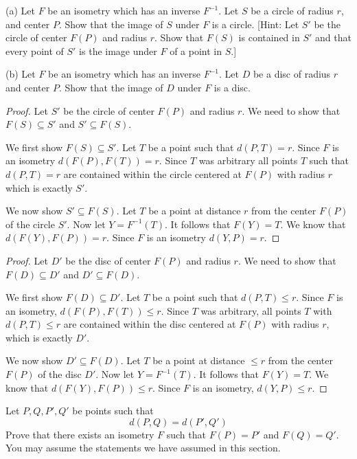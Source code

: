 \begin{tcolorbox}[title=Problem 1, breakable]
    (a) Let $F$ be an isometry which has an inverse $F^{-1}$.
    Let $S$ be a circle of radius $r$, and center $P$.
    Show that the image of $S$ under $F$ is a circle.
    [Hint: Let $S'$ be the circle of center $F(P)$ and radius $r$.
    Show that $F(S)$ is contained in $S'$ and that every point of $S'$
    is the image under $F$ of a point in $S$.]

    (b) Let $F$ be an isometry which has an inverse $F^{-1}$.
    Let $D$ be a disc of radius $r$ and center $P$.
    Show that the image of $D$ under $F$ is a disc.
\end{tcolorbox}

\begin{proof}
    Let $S'$ be the circle of center $F(P)$ and radius $r$.
    We need to show that $F(S) \subseteq S'$ and $S' \subseteq F(S)$.

    We first show $F(S) \subseteq S'$. Let $T$ be a point such that $d(P, T) = r$.
    Since $F$ is an isometry $d(F(P), F(T)) = r$.
    Since $T$ was arbitrary all points $T$ such that $d(P, T) = r$
        are contained within the circle centered at 
        $F(P)$ with radius $r$ which is exactly $S'$.

    We now show $S' \subseteq F(S)$. 
    Let $T$ be a point at distance $r$ from the center $F(P)$ of the circle $S'$.
    Now let $Y = F^{-1}(T)$. It follows that $F(Y) = T$.
    We know that  $d(F(Y), F(P)) = r$.
    Since $F$ is an isometry $d(Y, P) = r$.
\end{proof}

\begin{proof}
    Let $D'$ be the disc of center $F(P)$ and radius $r$.
    We need to show that $F(D) \subseteq D'$ and $D' \subseteq F(D)$.

    We first show $F(D) \subseteq D'$. Let $T$ be a point such that $d(P, T) \le r$.
    Since $F$ is an isometry, $d(F(P), F(T)) \le r$.
    Since $T$ was arbitrary, all points $T$ with $d(P, T) \le r$
        are contained within the disc centered at $F(P)$ with radius $r$, which is exactly $D'$.

    We now show $D' \subseteq F(D)$. 
    Let $T$ be a point at distance $\le r$ from the center $F(P)$ of the disc $D'$.
    Now let $Y = F^{-1}(T)$. It follows that $F(Y) = T$.
    We know that $d(F(Y), F(P)) \le r$.
    Since $F$ is an isometry, $d(Y, P) \le r$.
\end{proof}

\begin{tcolorbox}[title=Problem 2, breakable]
    Let $P, Q, P', Q'$ be points such that 
    \[d(P, Q) = d(P', Q')\]
    Prove that there exists an isometry $F$ such that $F(P) = P'$
    and $F(Q) = Q'$.
    You may assume the statements we have assumed in this section.
\end{tcolorbox}

